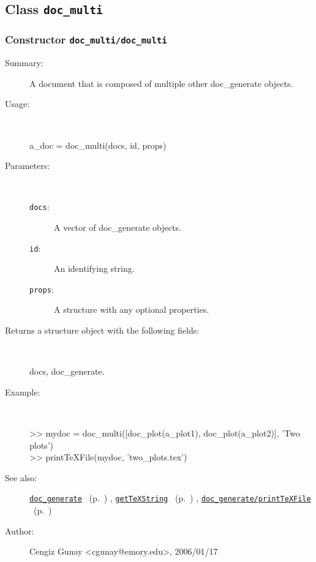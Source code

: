 \subsection{Class \texttt{doc\_multi}}%
%
\label{ref_doc_multi}%
\hypertarget{ref_doc_multi}{}%
\subsubsection[Constructor \texttt{doc\_multi}]{Constructor \texttt{doc\_multi/doc\_multi}}%
%
\label{ref_doc_multi__doc_multi}%
\hypertarget{ref_doc_multi__doc_multi}{}%
\begin{description}
\item[Summary:]A document that is composed of multiple other doc\_generate objects.
%
\item[Usage:]~%
\begin{lyxcode}%
a\_doc = doc\_multi(docs, id, props)
%
\end{lyxcode}%
%
%
\item[Parameters:]~
\begin{description}%
\item[\texttt{docs}:]
 A vector of doc\_generate objects.
\item[\texttt{id}:]
 An identifying string.
\item[\texttt{props}:]
 A structure with any optional properties.
\end{description}%
%
\item[Returns a structure object with the following fields:
]~

	docs, doc\_generate.
%
\item[Example:]~
\begin{lyxcode} >> mydoc = doc\_multi([doc\_plot(a\_plot1), doc\_plot(a\_plot2)], 'Two plots')
\\%
 >> printTeXFile(mydoc, 'two\_plots.tex')
\\%
\end{lyxcode}
%
\item[See also:]%
\hyperlink{ref_doc_generate}{\texttt{doc\_generate}}%
\ (p.~\pageref{ref_doc_generate})%
%
, \hyperlink{ref_getTeXString}{\texttt{getTeXString}}%
\ (p.~\pageref{ref_getTeXString})%
%
, \hyperlink{ref_doc_generate__printTeXFile}{\texttt{doc\_generate/printTeXFile}}%
\ (p.~\pageref{ref_doc_generate__printTeXFile})%
%
%
\item[Author:]%
Cengiz Gunay <cgunay@emory.edu>, 2006/01/17
%
\end{description}
\methodline%
